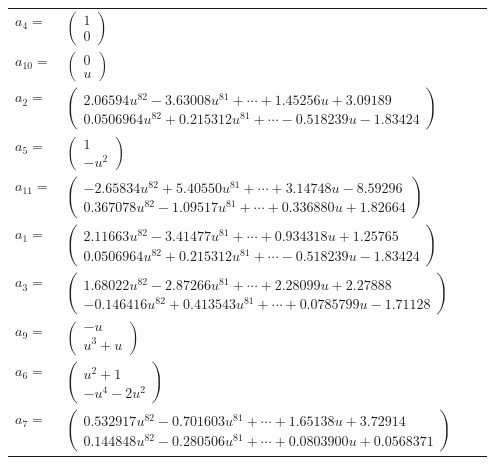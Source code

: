 \documentclass[1p]{elsarticle_modified}
\theoremstyle{definition}
\begin{document}
\begin{tabular}{m{7pt} m{180pt} m{7pt} m{180pt} }
\flushright $a_{4}=$&$\begin{pmatrix}1\\0\end{pmatrix}$ \\
\flushright $a_{10}=$&$\begin{pmatrix}0\\u\end{pmatrix}$ \\
\flushright $a_{2}=$&$\begin{pmatrix}2.06594 u^{82}-3.63008 u^{81}+\cdots+1.45256 u+3.09189\\0.0506964 u^{82}+0.215312 u^{81}+\cdots-0.518239 u-1.83424\end{pmatrix}$ \\
\flushright $a_{5}=$&$\begin{pmatrix}1\\- u^2\end{pmatrix}$ \\
\flushright $a_{11}=$&$\begin{pmatrix}-2.65834 u^{82}+5.40550 u^{81}+\cdots+3.14748 u-8.59296\\0.367078 u^{82}-1.09517 u^{81}+\cdots+0.336880 u+1.82664\end{pmatrix}$ \\
\flushright $a_{1}=$&$\begin{pmatrix}2.11663 u^{82}-3.41477 u^{81}+\cdots+0.934318 u+1.25765\\0.0506964 u^{82}+0.215312 u^{81}+\cdots-0.518239 u-1.83424\end{pmatrix}$ \\
\flushright $a_{3}=$&$\begin{pmatrix}1.68022 u^{82}-2.87266 u^{81}+\cdots+2.28099 u+2.27888\\-0.146416 u^{82}+0.413543 u^{81}+\cdots+0.0785799 u-1.71128\end{pmatrix}$ \\
\flushright $a_{9}=$&$\begin{pmatrix}- u\\u^3+u\end{pmatrix}$ \\
\flushright $a_{6}=$&$\begin{pmatrix}u^2+1\\- u^4-2 u^2\end{pmatrix}$ \\
\flushright $a_{7}=$&$\begin{pmatrix}0.532917 u^{82}-0.701603 u^{81}+\cdots+1.65138 u+3.72914\\0.144848 u^{82}-0.280506 u^{81}+\cdots+0.0803900 u+0.0568371\end{pmatrix}$ \\

\end{tabular}
\end{document}
